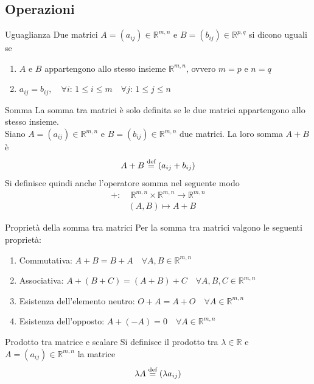 \subsection{Operazioni}%
\label{sub:operazioni}

\begin{Def}{Uguaglianza}
  Due matrici $A=(a_{ij})\in\mathbb{R}^{m,n}$ e $B=(b_{ij})\in\mathbb{R}^{p,q}$ si dicono
  uguali se
  \begin{enumerate}
    \item $A$ e $B$ appartengono allo stesso insieme $\mathbb{R}^{m,n}$, ovvero $m=p$ e
      $n=q$
    \item $a_{ij} = b_{ij},\quad\forall i:\,1\leq i\leq m \quad\forall j:\,1\leq j\leq n$
  \end{enumerate}
\end{Def}

\begin{Def}{Somma}
  La somma tra matrici è solo definita se le due matrici appartengono allo stesso
  insieme.\\
  Siano $A=(a_{ij})\in\mathbb{R}^{m,n}$ e $B=(b_{ij})\in\mathbb{R}^{m,n}$ due matrici.
  La loro somma $A+B$ è
  \begin{equation*}
    A+B\overset{\text{def}}{=} (a_{ij}+b_{ij})
  \end{equation*}
  Si definisce quindi anche l'operatore somma nel seguente modo
  \begin{align*}
    +:&\;\mathbb{R}^{m,n}\times\mathbb{R}^{m,n}\rightarrow\mathbb{R}^{m,n}\\
      & (A,B)\mapsto A+B
  \end{align*}
\end{Def}

\begin{SubDef}{Proprietà della somma tra matrici}
  Per la somma tra matrici valgono le seguenti proprietà:
  \begin{enumerate}
    \item Commutativa: $A+B = B+A\quad\forall A,B\in\mathbb{R}^{m,n}$
    \item Associativa: $A+(B+C) = (A+B)+C\quad\forall A,B,C\in\mathbb{R}^{m,n}$
    \item Esistenza dell'elemento neutro: $O+A = A+O\quad\forall A\in\mathbb{R}^{m,n}$
    \item Esistenza dell'opposto: $A+(-A) = 0\quad\forall A\in\mathbb{R}^{m,n}$
  \end{enumerate}
\end{SubDef}

\begin{Def}{Prodotto tra matrice e scalare}
  Si definisce il prodotto tra $\lambda\in\mathbb{R}$ e $A=(a_{ij})\in\mathbb{R}^{m,n}$
  la matrice
  \begin{equation*}
    \lambda A\overset{\text{def}}{=}(\lambda a_{ij})
  \end{equation*}
\end{Def}

